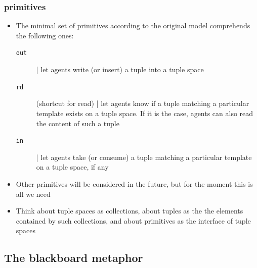 \documentclass[presentation]{beamer}\mode<presentation>{\usetheme{AMSCesenaPurpleAndGold}}
\begin{document}
\begin{frame}%
\frametitle{ primitives}

\begin{itemize}
\item The minimal set of \alert{primitives} according to the original  model comprehends the following ones:
%

%
\begin{description}
	\item[\texttt{out}] | let agents \alert{write} (or \alert{insert}) a tuple into a tuple space 
	
	
	
	\item[\texttt{rd}] (shortcut for \alert{read}) | let agents know if a tuple matching a particular template \alert{exists} on a tuple space. 
	If it is the case, agents can also read the content of such a tuple
	
	
	
	\item[\texttt{in}] | let agents \alert{take} (or \alert{consume}) a tuple matching a particular template on a tuple space, if any
\end{description}



\item Other primitives will be considered in the future, but for the moment this is all we need



\item Think about tuple spaces as \alert{collections}, about tuples as the the elements contained by such collections, and about primitives as the \alert{interface} of tuple spaces

\end{itemize}

\end{frame}

\subsection{The blackboard metaphor} 
\end{document}
